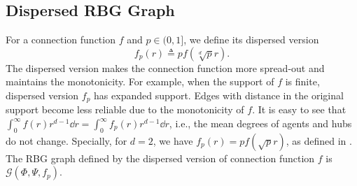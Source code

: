 \subsection{Dispersed RBG Graph}
 For a connection function $f$ and $p\in(0,1]$, we define its dispersed version
\begin{equation}
f_{p}(r) \triangleq p f(\sqrt[d]{p}r).
\end{equation}
{The dispersed version makes the connection function more spread-out and maintains the monotonicity. For example, when the support of $f$ is finite, dispersed version $f_p$ has expanded support. Edges with distance in the original support become less
reliable due to the monotonicity of $f$.}
It is easy to see that
$\int_0^{\infty} f(r)r^{d-1} \dd r = \int_{0}^{\infty} f_p(r)r^{d-1} \dd r$, i.e., the mean degrees of agents and hubs do not change. Specially, for $d=2$, we have $f_{p}(r) =p f(\sqrt{p}r)$, as defined in \cite{Franceschetti05continuumpercolation}. The RBG graph defined by the dispersed version of  connection function $f$ is $\mathcal{G}(\Phi,\Psi, f_p)$. 








% 







